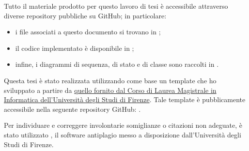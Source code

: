 \medskip

Tutto il materiale prodotto per questo lavoro di tesi è accessibile attraverso diverse repository pubbliche su GitHub; in particolare:

\begin{itemize}

\item i file \latex associati a questo documento si trovano in \myThesisRepo;

\item il codice implementato è disponibile in \myCodeRepo;

\item infine, i diagrammi di sequenza, di stato e di classe sono raccolti in \myDiagramsRepo.

\end{itemize}

Questa tesi è stato realizzata utilizzando come base un template che ho sviluppato a partire da \href{https://www.informaticamagistrale.unifi.it/vp-17-per-laurearsi.html}{quello fornito dal Corso di Laurea Magistrale in Informatica dell'Università degli Studi di Firenze}. Tale template è pubblicamente accessibile nella seguente repository GitHub: \myThesisTemplateRepo.

%
%
%
%
%
%
%
%
%
%
%

\medskip

Per individuare e correggere involontarie somiglianze o citazioni non adeguate, è stato utilizzato \myAntiplagio, il software antiplagio messo a disposizione dall'Università degli Studi di Firenze.